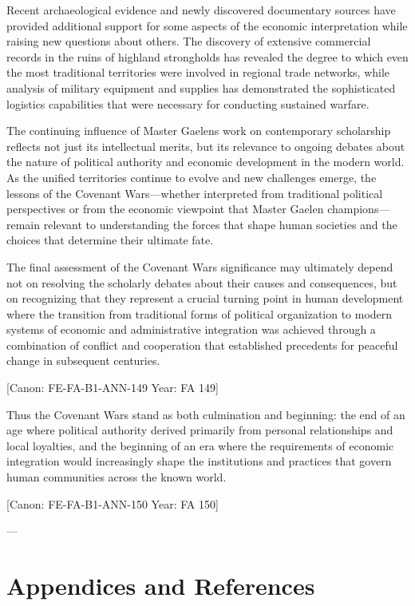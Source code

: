 Recent archaeological evidence and newly discovered documentary sources
have provided additional support for some aspects of the economic
interpretation while raising new questions about others. The discovery
of extensive commercial records in the ruins of highland strongholds has
revealed the degree to which even the most traditional territories were
involved in regional trade networks, while analysis of military
equipment and supplies has demonstrated the sophisticated logistics
capabilities that were necessary for conducting sustained warfare.

The continuing influence of Master Gaelen\textquotesingle s work on
contemporary scholarship reflects not just its intellectual merits, but
its relevance to ongoing debates about the nature of political authority
and economic development in the modern world. As the unified territories
continue to evolve and new challenges emerge, the lessons of the
Covenant Wars---whether interpreted from traditional political
perspectives or from the economic viewpoint that Master Gaelen
champions---remain relevant to understanding the forces that shape human
societies and the choices that determine their ultimate fate.

The final assessment of the Covenant Wars\textquotesingle{} significance
may ultimately depend not on resolving the scholarly debates about their
causes and consequences, but on recognizing that they represent a
crucial turning point in human development where the transition from
traditional forms of political organization to modern systems of
economic and administrative integration was achieved through a
combination of conflict and cooperation that established precedents for
peaceful change in subsequent centuries.

{[}Canon: FE-FA-B1-ANN-149 \textbar{} Year: FA 149{]}

Thus the Covenant Wars stand as both culmination and beginning: the end
of an age where political authority derived primarily from personal
relationships and local loyalties, and the beginning of an era where the
requirements of economic integration would increasingly shape the
institutions and practices that govern human communities across the
known world.

{[}Canon: FE-FA-B1-ANN-150 \textbar{} Year: FA 150{]}

---

\section{Appendices and References}\label{appendices-and-references}

